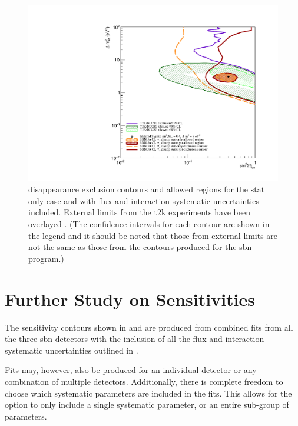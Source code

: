 \begin{figure}
    \centering
    \includegraphics[width = \largefigwidth]{figures-chap6/overlays/valor_overlays_nue_disapp.pdf}
    \caption[\nue disappearance contours with external limits.]{\nue disappearance exclusion contours and allowed regions for the stat only case and with flux and interaction systematic uncertainties included. External limits from the \gls{t2k} experiments have been overlayed \cite{T2K_nue_disapp_contour}. (The confidence intervals for each contour are shown in the legend and it should be noted that those from external limits are not the same as those from the contours produced for the \gls{sbn} program.)}
    \label{fig:nue_disapp_global_sensitivity}
\end{figure}


\clearpage
\section{Further Study on Sensitivities}

The sensitivity contours shown in  and  are produced from combined fits from all the three \gls{sbn} detectors with the inclusion of all the flux and interaction systematic uncertainties outlined in .

Fits may, however, also be produced for an individual detector or any combination of multiple detectors. Additionally, there is complete freedom to choose which systematic parameters are included in the fits. This allows for the option to only include a single systematic parameter, or an entire sub-group of parameters. 

